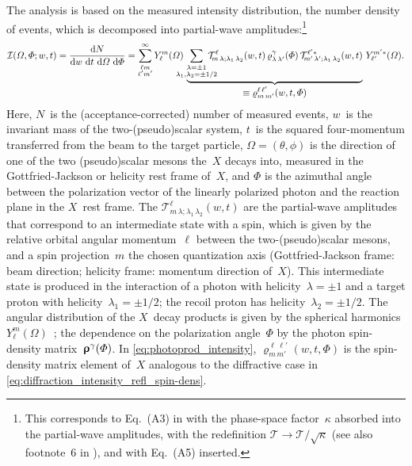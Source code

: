 The analysis is based on the measured intensity distribution, \ie the
number density of events, which is decomposed into partial-wave
amplitudes:\footnote{\label{fn:photoprod_ampl_redef}This corresponds
to Eq.~(A3) in  with the phase-space
factor~$\kappa$ absorbed into the partial-wave amplitudes, \ie with
the redefinition $\mathcal{T} \to \mathcal{T} / \sqrt{\kappa}$ (see
also footnote~6 in ), and with Eq.~(A5)
inserted.}
\begin{equation}
  \label{eq:photoprod_intensity}
  \mathcal{I}(\Omega, \Phi; w, t)
  = \frac{\dif{N}}{\dif{w}\, \dif{t}\, \dif{\Omega}\, \dif{\Phi}}
  = \sum_{\substack{\ell m \\ \ell' m'}}^\infty
  Y_\ell^m(\Omega)~
  \dUnderbrace{\sum_{\substack{\lambda = \pm 1 \\ \mathclap{\lambda_1, \lambda_2 = \pm 1/2}}}
  \mathcal{T}^\ell_{\!m\, \lambda; \lambda_1\, \lambda_2}(w, t)\,
  \varrho^\gamma_{\lambda\, \lambda'}(\Phi)\,
  \mathcal{T}^{\ell' *}_{\!m'\, \lambda'; \lambda_1\, \lambda_2}(w, t)}{\equiv \varrho^{\ell\, \ell'}_{m\, m'}(w, t, \Phi)}~
  Y_{\ell'}^{m' *}(\Omega).
\end{equation}
Here, $N$~is the (acceptance-corrected) number of measured events,
$w$~is the invariant mass of the two-(pseudo)scalar system, $t$~is the
squared four-momentum transferred from the beam to the target
particle, $\Omega = (\theta, \phi)$ is the direction of one of the two
(pseudo)scalar mesons the~$X$ decays into, measured in the
Gottfried-Jackson or helicity rest frame of~$X$, and $\Phi$ is the
azimuthal angle between the polarization vector of the
linearly polarized photon and the reaction plane in the $X$~rest
frame.  The $\mathcal{T}^\ell_{\!m\, \lambda; \lambda_1\,
\lambda_2}(w, t)$ are the partial-wave amplitudes that correspond to
an intermediate state with a spin, which is given by the relative
orbital angular momentum~$\ell$ between the two-(pseudo)scalar mesons,
and a spin projection~$m$ \wrt the chosen quantization axis
(Gottfried-Jackson frame: beam direction; helicity frame: momentum
direction of~$X$).  This intermediate state is produced in the
interaction of a photon with helicity~$\lambda = \pm 1$ and a target
proton with helicity~$\lambda_1 = \pm 1/2$; the recoil proton has
helicity~$\lambda_2 = \pm 1/2$.  The angular distribution of the
$X$~decay products is given by the spherical harmonics
$Y_\ell^m(\Omega)$~\cite{wikipedia:sphericalHarm}; the dependence on
the polarization angle~$\Phi$ by the photon spin-density
matrix~$\bm{\mathrm{\upvarrho}}^\gamma(\Phi)$.  In
\cref{eq:photoprod_intensity}, $\varrho^{\ell\, \ell'}_{m\, m'}(w, t,
\Phi)$ is the spin-density matrix element of~$X$ analogous to the
diffractive case in \cref{eq:diffraction_intensity_refl_spin-dens}.

